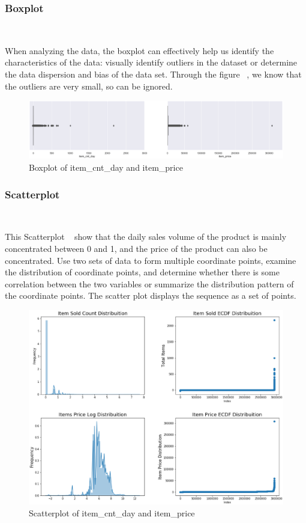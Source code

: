 \subsubsection{Boxplot}
\
 
When analyzing the data, 
the boxplot can effectively 
help us identify the characteristics of the data:
visually identify outliers in the dataset or
determine the data dispersion and 
bias of the data set. 
Through the figure ~, 
we know that the outliers are very small,
so can be ignored.


\begin{figure}[htbp]
	\centering
	\includegraphics[scale=0.3]{figures/boxplot.eps}
	\caption{Boxplot of item_cnt_day and item_price}\label{fig:boxplot}
\end{figure}


\subsubsection{Scatterplot} 
\

This Scatterplot ~ show 
that the daily sales volume 
of the product is mainly concentrated 
between 0 and 1, and the 
price of the product can also be concentrated. 
Use two sets of data to form multiple 
coordinate points, examine the distribution 
of coordinate points, and determine 
whether there is some correlation 
between the two variables or summarize 
the distribution pattern of the 
coordinate points. The scatter 
plot displays the sequence as a set of points.

\begin{figure}[htbp]
	\centering
	\includegraphics[scale=0.4]{figures/scatterplot.eps}
	\caption{Scatterplot of item_cnt_day and item_price}\label{fig:scatterplot}
\end{figure}

